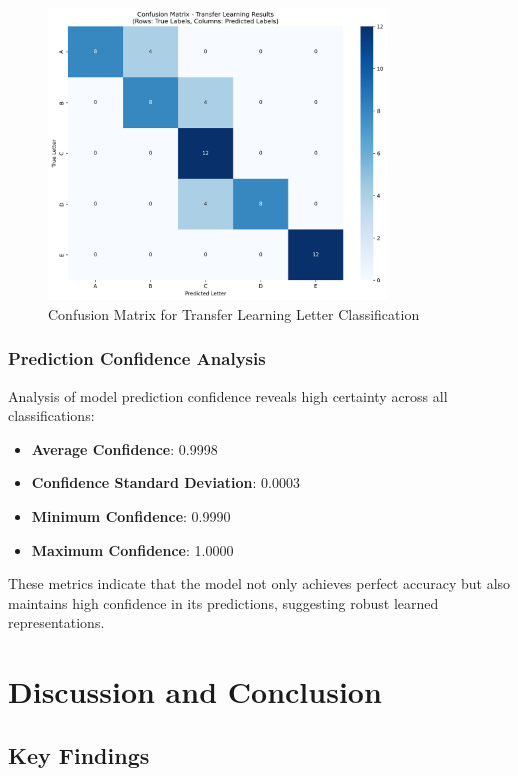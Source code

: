 \documentclass[12pt,a4paper]{article}
\begin{document}
\begin{figure}[!h]
\centering
\includegraphics[width=0.8\textwidth]{images/transfer_learning_confusion_matrix_updated.png}
\caption{Confusion Matrix for Transfer Learning Letter Classification}
\end{figure}

\subsubsection{Prediction Confidence Analysis}

Analysis of model prediction confidence reveals high certainty across all classifications:
\begin{itemize}
    \item \textbf{Average Confidence}: 0.9998
    \item \textbf{Confidence Standard Deviation}: 0.0003
    \item \textbf{Minimum Confidence}: 0.9990
    \item \textbf{Maximum Confidence}: 1.0000
\end{itemize}

These metrics indicate that the model not only achieves perfect accuracy but also maintains high confidence in its predictions, suggesting robust learned representations.

\section{Discussion and Conclusion}

\subsection{Key Findings}
\end{document}
